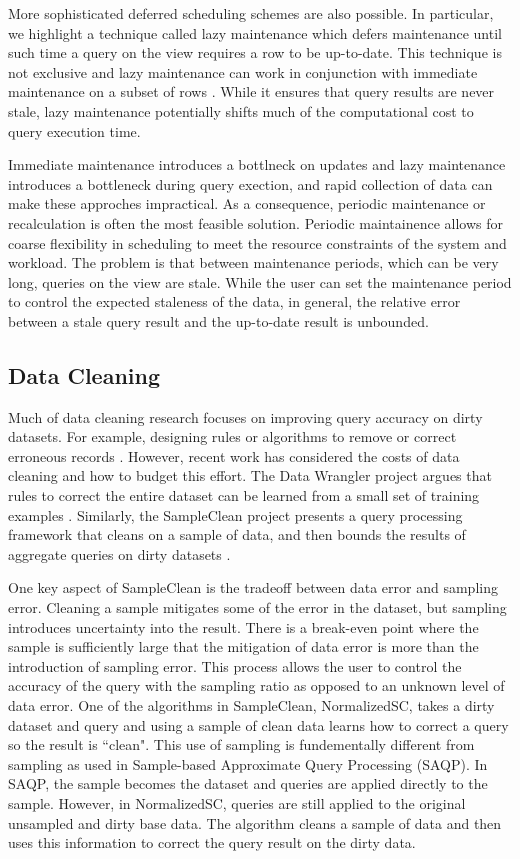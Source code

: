 More sophisticated deferred scheduling schemes are also possible.
In particular, we highlight a technique called lazy maintenance which defers maintenance until such time
a query on the view requires a row to be up-to-date.
This technique is not exclusive and lazy maintenance can work in conjunction with immediate maintenance on a subset of rows \cite{zhou2007lazy}.
While it ensures that query results are never stale, lazy maintenance potentially shifts much of the computational cost
to query execution time.

Immediate maintenance introduces a bottlneck on updates and lazy maintenance introduces a bottleneck during query exection,
and rapid collection of data can make these approches impractical.
As a consequence, periodic maintenance or recalculation is often the most feasible solution.
Periodic maintainence allows for coarse flexibility in scheduling to meet the resource constraints of the system and workload.
The problem is that between maintenance periods, which can be very long, queries on the view are stale.
While the user can set the maintenance period to control the expected staleness of the data, in general, the relative error between a stale query result and the up-to-date result is unbounded.

\subsection{Data Cleaning}
Much of data cleaning research focuses on improving query accuracy on dirty datasets.
For example, designing rules or algorithms to remove or correct erroneous records \cite{rahm2000data}.
However, recent work has considered the costs of data cleaning and how to budget this effort.
The Data Wrangler project argues that rules to correct the entire dataset can be learned from a small set of training examples \cite{kandel2011wrangler}.
Similarly, the SampleClean project presents a query processing framework that cleans on a sample of data, and then bounds the results of aggregate queries on dirty datasets \cite{wang1999sample}.

One key aspect of SampleClean is the tradeoff between data error and sampling error.
Cleaning a sample mitigates some of the error in the dataset, but sampling introduces uncertainty into the result.
There is a break-even point where the sample is sufficiently large that the mitigation of data error is more than the introduction
of sampling error.
This process allows the user to control the accuracy of the query with the sampling ratio as opposed to an unknown level of data error.
One of the algorithms in SampleClean, NormalizedSC, takes a dirty dataset and query and using a sample of clean data learns how
to correct a query so the result is ``clean".
This use of sampling is fundementally different from sampling as used in Sample-based Approximate Query Processing (SAQP).
In SAQP, the sample becomes the dataset and queries are applied directly to the sample.
However, in NormalizedSC, queries are still applied to the original unsampled and dirty base data.
The algorithm cleans a sample of data and then uses this information to correct the query result on the dirty data.

